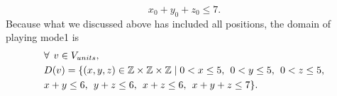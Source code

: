 \begin{equation}
x_{0}+y_{0}+z_{0}\leq7.
\end{equation}
Because what we discussed above has included all positions, the domain of playing mode1 is
\begin{equation}
\begin{aligned}
&\forall \hspace{1ex} v \in V_{units},\\
&D(v)=\{(x,y,z) \in \mathbb{Z} \times \mathbb{Z}	\times \mathbb{Z} \mid  0<x \leq 5, \hspace{1ex} 0<y \leq 5,\hspace{1ex} 0<z \leq 5,\\ &x+y\leq 6,\hspace{1ex} y+z\leq 6,\hspace{1ex}x+z\leq 6,\hspace{1ex}x+y+z\leq 7\}.
\end{aligned}
\end{equation}
